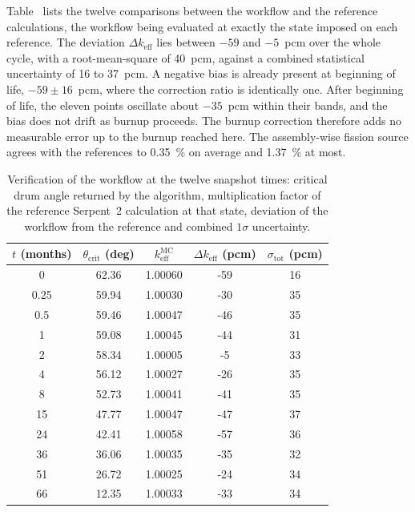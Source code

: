 Table~ lists the twelve comparisons between the
workflow and the reference calculations, the workflow being evaluated at
exactly the state imposed on each reference. The deviation
$\Delta k_{\mathrm{eff}}$ lies between $-59$ and $-5$~pcm over the whole cycle,
with a root-mean-square of \SI{40}{pcm}, against a combined statistical
uncertainty of 16 to \SI{37}{pcm}. A negative bias is already present at
beginning of life, $-59\pm16$~pcm, where the correction ratio is identically
one. After beginning of life, the eleven points oscillate about $-35$~pcm
within their bands, and the bias does not drift as burnup proceeds. The burnup correction therefore adds no
measurable error up to the burnup reached here. The assembly-wise fission source agrees with the
references to \SI{0.35}{\percent} on average and \SI{1.37}{\percent} at most.

\begin{table}[htbp]
  \centering
  \caption[Verification of the cycle against reference calculations]{Verification
  of the workflow at the twelve snapshot times: critical drum angle returned by
  the algorithm, multiplication factor of the reference Serpent~2 calculation at
  that state, deviation of the workflow from the reference and combined
  $1\sigma$ uncertainty.}
  \label{cs:tab:verification}
  \begin{tabular}{S[table-format=2.2] S[table-format=2.2] S[table-format=1.5] S[table-format=-2.0] S[table-format=2.0]}
    \toprule
    {$t$ (months)} & {$\theta_{\mathrm{crit}}$ (deg)} & {$k^{\mathrm{MC}}_{\mathrm{eff}}$} &
    {$\Delta k_{\mathrm{eff}}$ (pcm)} & {$\sigma_{\mathrm{tot}}$ (pcm)} \\
        & 62.36 & 1.00060 & -59 & 16 \\
     0.25 & 59.94 & 1.00030 & -30 & 35 \\
     0.5  & 59.46 & 1.00047 & -46 & 35 \\
     1    & 59.08 & 1.00045 & -44 & 31 \\
     2    & 58.34 & 1.00005 &  -5 & 33 \\
     4    & 56.12 & 1.00027 & -26 & 35 \\
     8    & 52.73 & 1.00041 & -41 & 35 \\
    15    & 47.77 & 1.00047 & -47 & 37 \\
    24    & 42.41 & 1.00058 & -57 & 36 \\
    36    & 36.06 & 1.00035 & -35 & 32 \\
    51    & 26.72 & 1.00025 & -24 & 34 \\
    66    & 12.35 & 1.00033 & -33 & 34 \\
    \bottomrule
  \end{tabular}
\end{table}

